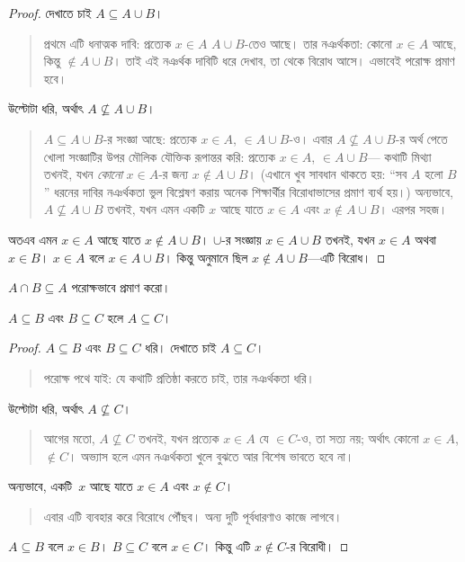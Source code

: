\documentclass[../../../include/open-logic-section]{subfiles}
\begin{document}
\begin{proof}
  দেখাতে চাই $A \subseteq A \cup B$।
  \begin{quote}
    প্রথমে এটি ধনাত্মক দাবি: প্রত্যেক $x \in A$
    $A \cup B$-তেও আছে। তার নঞর্থকতা:
    কোনো $x \in A$ আছে, কিন্তু
    $\notin A \cup B$। তাই এই নঞর্থক দাবিটি
    ধরে দেখাব, তা থেকে বিরোধ আসে। এভাবেই
    পরোক্ষ প্রমাণ হবে।
  \end{quote}
  উল্টোটা ধরি, অর্থাৎ $A \nsubseteq A \cup B$।
  \begin{quote}
    $A \subseteq A \cup B$-র সংজ্ঞা আছে: প্রত্যেক
    $x \in A$, $\in A \cup B$-ও। এবার
    $A \nsubseteq A \cup B$-র অর্থ পেতে
    খোলা সংজ্ঞাটির উপর মৌলিক যৌক্তিক রূপান্তর
    করি: প্রত্যেক $x \in A$, $\in A \cup B$—
    কথাটি মিথ্যা তখনই, যখন \emph{কোনো}
    $x \in A$-র জন্য $x \notin A \cup B$।
    (এখানে খুব সাবধান থাকতে হয়: ``সব $A$ হলো
    $B$'' ধরনের দাবির নঞর্থকতা ভুল বিশ্লেষণ
    করায় অনেক শিক্ষার্থীর বিরোধাভাসের প্রমাণ
    ব্যর্থ হয়।) অন্যভাবে,
    $A \nsubseteq A \cup B$ তখনই, যখন এমন
    একটি $x$ আছে যাতে $x \in A$ এবং
    $x \notin A \cup B$। এরপর সহজ।
  \end{quote}
  অতএব এমন $x \in A$ আছে যাতে
  $x \notin A \cup B$। $\cup$-র সংজ্ঞায়
  $x \in A \cup B$ তখনই, যখন $x \in A$
  অথবা $x \in B$। $x \in A$ বলে
  $x \in A \cup B$। কিন্তু অনুমানে ছিল
  $x \notin A \cup B$—এটি বিরোধ।
\end{proof}

\begin{prob}
$A \cap B \subseteq A$ পরোক্ষভাবে প্রমাণ করো।
\end{prob}

\begin{prop}
$A \subseteq B$ এবং $B \subseteq C$ হলে
$A \subseteq C$।
\end{prop}

\begin{proof}
  $A \subseteq B$ এবং $B \subseteq C$ ধরি।
  দেখাতে চাই $A \subseteq C$।
  \begin{quote}
    পরোক্ষ পথে যাই: যে কথাটি প্রতিষ্ঠা করতে চাই,
    তার নঞর্থকতা ধরি।
  \end{quote}
  উল্টোটা ধরি, অর্থাৎ $A \nsubseteq C$।
  \begin{quote}
    আগের মতো, $A \nsubseteq C$ তখনই, যখন
    প্রত্যেক $x \in A$ যে $\in C$-ও, তা
    সত্য নয়; অর্থাৎ কোনো $x \in A$,
    $\notin C$। অভ্যাস হলে এমন নঞর্থকতা
    খুলে বুঝতে আর বিশেষ ভাবতে হবে না।
  \end{quote}
  অন্যভাবে, একটি~$x$ আছে যাতে
  $x \in A$ এবং $x \notin C$।
  \begin{quote}
    এবার এটি ব্যবহার করে বিরোধে পৌঁছব।
    অন্য দুটি পূর্বধারণাও কাজে লাগবে।
  \end{quote}
  $A \subseteq B$ বলে $x \in B$।
  $B \subseteq C$ বলে $x \in C$।
  কিন্তু এটি $x \notin C$-র বিরোধী।
\end{proof}
\end{document}
